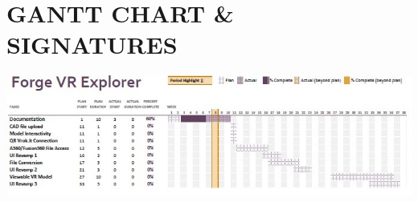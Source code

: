 \documentclass[letterpaper, 10pt, draftclsnofoot, compsoc, onecolumn]{IEEEtran}
\begin{document}

\clearpage
\section[GANTT CHART/SIGNATURES]{\rmfamily\bfseries\color{black}
GANTT CHART \& SIGNATURES}

\begin{center}
	\includegraphics[scale=0.8]{GanttChart.jpg}
\end{center}
\end{document}
